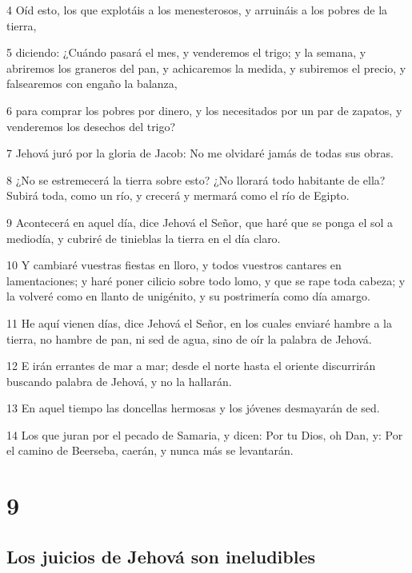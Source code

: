 \par 4 Oíd esto, los que explotáis a los menesterosos, y arruináis a los pobres de la tierra,
\par 5 diciendo: ¿Cuándo pasará el mes, y venderemos el trigo; y la semana, y abriremos los graneros del pan, y achicaremos la medida, y subiremos el precio, y falsearemos con engaño la balanza,
\par 6 para comprar los pobres por dinero, y los necesitados por un par de zapatos, y venderemos los desechos del trigo?
\par 7 Jehová juró por la gloria de Jacob: No me olvidaré jamás de todas sus obras.
\par 8 ¿No se estremecerá la tierra sobre esto? ¿No llorará todo habitante de ella? Subirá toda, como un río, y crecerá y mermará como el río de Egipto.
\par 9 Acontecerá en aquel día, dice Jehová el Señor, que haré que se ponga el sol a mediodía, y cubriré de tinieblas la tierra en el día claro.
\par 10 Y cambiaré vuestras fiestas en lloro, y todos vuestros cantares en lamentaciones; y haré poner cilicio sobre todo lomo, y que se rape toda cabeza; y la volveré como en llanto de unigénito, y su postrimería como día amargo.
\par 11 He aquí vienen días, dice Jehová el Señor, en los cuales enviaré hambre a la tierra, no hambre de pan, ni sed de agua, sino de oír la palabra de Jehová.
\par 12 E irán errantes de mar a mar; desde el norte hasta el oriente discurrirán buscando palabra de Jehová, y no la hallarán.
\par 13 En aquel tiempo las doncellas hermosas y los jóvenes desmayarán de sed.
\par 14 Los que juran por el pecado de Samaria, y dicen: Por tu Dios, oh Dan, y: Por el camino de Beerseba, caerán, y nunca más se levantarán.

\chapter{9}

\section*{Los juicios de Jehová son ineludibles}

